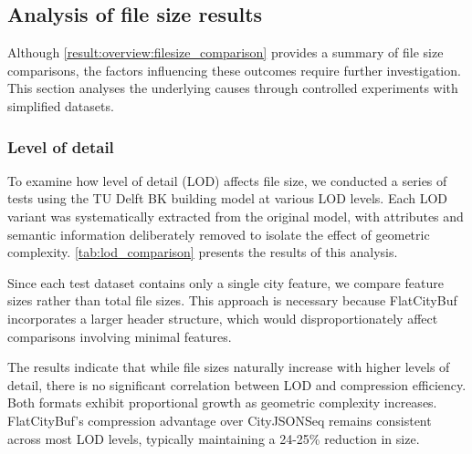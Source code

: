 \subsection{Analysis of file size results}
\label{result:overview:analysis_of_file_size_results}
Although \autoref{result:overview:filesize_comparison} provides a summary of file size comparisons, the factors influencing these outcomes require further investigation. This section analyses the underlying causes through controlled experiments with simplified datasets.

\subsubsection{Level of detail}
\label{result:overview:analysis_of_file_size_results:level_of_detail}

To examine how level of detail (LOD) affects file size, we conducted a series of tests using the TU Delft BK building model at various LOD levels. Each LOD variant was systematically extracted from the original model, with attributes and semantic information deliberately removed to isolate the effect of geometric complexity. \autoref{tab:lod_comparison} presents the results of this analysis.

Since each test dataset contains only a single city feature, we compare feature sizes rather than total file sizes. This approach is necessary because FlatCityBuf incorporates a larger header structure, which would disproportionately affect comparisons involving minimal features.

The results indicate that while file sizes naturally increase with higher levels of detail, there is no significant correlation between LOD and compression efficiency. Both formats exhibit proportional growth as geometric complexity increases. FlatCityBuf's compression advantage over CityJSONSeq remains consistent across most LOD levels, typically maintaining a 24-25\% reduction in size.

